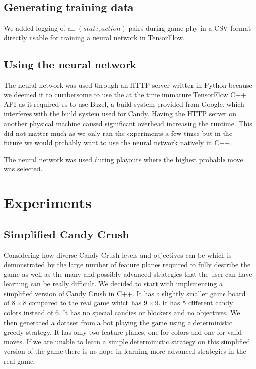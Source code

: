 \documentclass{kththesis}
\begin{document}
\subsection{Generating training data}
We added logging of all $(state, action)$ pairs  during game play in a CSV-format directly usable for training a neural network in TensorFlow.

\subsection{Using the neural network}
The neural network was used through an HTTP server written in Python because we deemed it to cumbersome to use the at the time immature TensorFlow C++ API as it required us to use Bazel, a build system provided from Google, which interferes with the build system used for Candy. Having the HTTP server on another physical machine caused significant overhead increasing the runtime. This did not matter much as we only ran the experiments a few times but in the future we would probably want to use the neural network natively in C++.

The neural network was used during playouts where the highest probable move was selected.



\section{Experiments}
\subsection{Simplified Candy Crush}
Considering how diverse Candy Crush levels and objectives can be which is demonstrated by the large number of feature planes required to fully describe the game as well as the many and possibly advanced strategies that the user can  have learning  can be really difficult. We decided to start with implementing a simplified version of Candy Crush in C++. It has a slightly smaller game board of $8\times8$ compared to the real game which has $9\times9$. It has 5 different candy colors instead of 6. It has no special candies or blockers and no objectives. We then generated a dataset from a bot playing the game using a deterministic greedy strategy. It has only two feature planes, one for colors and one for valid moves. If we are unable to learn a simple deterministic strategy on this simplified version of the game there is no hope in learning more advanced strategies in the real game. 
\end{document}
